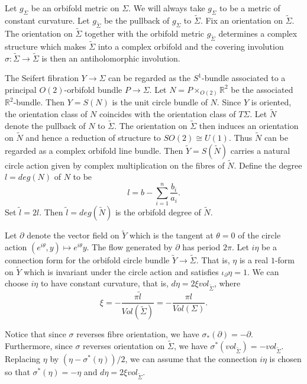 \documentclass{amsart}
\theoremstyle{definition}
\theoremstyle{remark}
\numberwithin{equation}{section}
\begin{document}
Let $g_\Sigma$ be an orbifold metric on $\Sigma$. We will always take $g_\Sigma$ to be a metric of constant curvature. Let $g_{\widetilde{\Sigma}}$ be the pullback of $g_{\Sigma}$ to $\widetilde{\Sigma}$. Fix an orientation on $\widetilde{\Sigma}$. The orientation on $\widetilde{\Sigma}$ together with the orbifold metric $g_{\widetilde{\Sigma}}$ determines a complex structure which makes $\widetilde{\Sigma}$ into a complex orbifold and the covering involution $\sigma \colon \widetilde{\Sigma} \to \widetilde{\Sigma}$ is then an antiholomorphic involution.

The Seifert fibration $Y \to \Sigma$ can be regarded as the $S^1$-bundle associated to a principal $O(2)$-orbifold bundle $P \to \Sigma$. Let $N = P \times_{O(2)} \mathbb{R}^2$ be the associated $\mathbb{R}^2$-bundle. Then $Y = S(N)$ is the unit circle bundle of $N$. Since $Y$ is oriented, the orientation class of $N$ coincides with the orientation class of $T\Sigma$. Let $\widetilde{N}$ denote the pullback of $N$ to $\widetilde{\Sigma}$. The orientation on $\widetilde{\Sigma}$ then induces an orientation on $\widetilde{N}$ and hence a reduction of structure to $SO(2) \cong U(1)$. Thus $\widetilde{N}$ can be regarded as a complex orbifold line bundle. Then $\widetilde{Y} = S(\widetilde{N})$ carries a natural circle action given by complex multiplication on the fibres of $\widetilde{N}$. Define the degree $l = deg(N)$ of $N$ to be
\[
l = b - \sum_{i=1}^n \frac{b_i}{a_i}.
\]
Set $\widetilde{l} = 2l$. Then $\widetilde{l} = deg(\widetilde{N})$ is the orbifold degree of $\widetilde{N}$.

Let $\partial$ denote the vector field on $\widetilde{Y}$ which is the tangent at $\theta = 0$ of the circle action $( e^{i \theta} , y ) \mapsto e^{i\theta}y$. The flow generated by $\partial$ has period $2\pi$. Let $i\eta$ be a connection form for the orbifold circle bundle $\widetilde{Y} \to \widetilde{\Sigma}$. That is, $\eta$ is a real $1$-form on $\widetilde{Y}$ which is invariant under the circle action and satisfies $\iota_{\partial} \eta = 1$. We can choose $i\eta$ to have constant curvature, that is, $d\eta = 2 \xi vol_{\widetilde{\Sigma}}$, where
\begin{equation}\label{equ:xi}
\xi = -\frac{ \pi \widetilde{l} }{Vol(\widetilde{\Sigma})} = - \frac{\pi l}{Vol(\Sigma)}.
\end{equation}

Notice that since $\sigma$ reverses fibre orientation, we have $\sigma_*(\partial) = -\partial$. Furthermore, since $\sigma$ reverses orientation on $\widetilde{\Sigma}$, we have $\sigma^*(vol_{\widetilde{\Sigma}}) = -vol_{\widetilde{\Sigma}}$. Replacing $\eta$ by $(\eta - \sigma^*(\eta))/2$, we can assume that the connection $i\eta$ is chosen so that $\sigma^*(\eta) = -\eta$ and $d\eta = 2 \xi vol_{\widetilde{\Sigma}}$.
\end{document}
